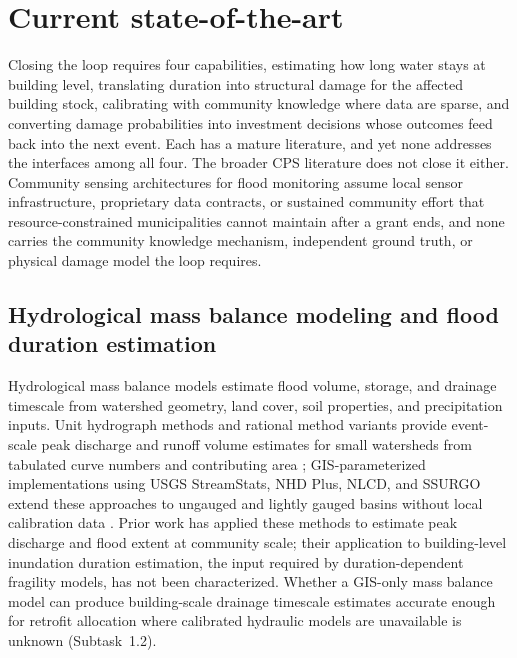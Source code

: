 \documentclass[11pt]{article}
\begin{document}

\vspace{-5pt}
\section{Current state-of-the-art}

Closing the loop requires four capabilities, estimating how long
water stays at building level, translating duration into structural
damage for the affected building stock, calibrating with community
knowledge where data are sparse, and converting damage probabilities
into investment decisions whose outcomes feed back into the next event.
Each has a mature literature, and yet none addresses the interfaces
among all four. The broader CPS literature does not close it either. Community
sensing architectures for flood monitoring assume local sensor
infrastructure, proprietary data contracts, or sustained community
effort that resource-constrained municipalities cannot maintain after
a grant ends, and none carries the community knowledge mechanism,
independent ground truth, or physical damage model the loop requires.

\subsection{Hydrological mass balance modeling and flood duration estimation}
Hydrological mass balance models estimate flood volume, storage, and drainage
timescale from watershed geometry, land cover, soil properties, and precipitation
inputs.
Unit hydrograph methods and rational method variants provide event-scale peak
discharge and runoff volume estimates for small watersheds from tabulated curve
numbers and contributing area \cite{usdascs1986tr55}; GIS-parameterized implementations using USGS
StreamStats, NHD Plus, NLCD, and SSURGO extend these approaches to ungauged
and lightly gauged basins without local calibration data
\cite{ries2017streamstats,moore2019nhdplus}.
Prior work has applied these methods to estimate peak discharge and flood extent
at community scale; their application to building-level inundation duration
estimation, the input required by duration-dependent fragility models, has not
been characterized.
Whether a GIS-only mass balance model can produce building-scale drainage timescale
estimates accurate enough for retrofit allocation where calibrated hydraulic models
are unavailable is unknown (Subtask~1.2).
\end{document}
